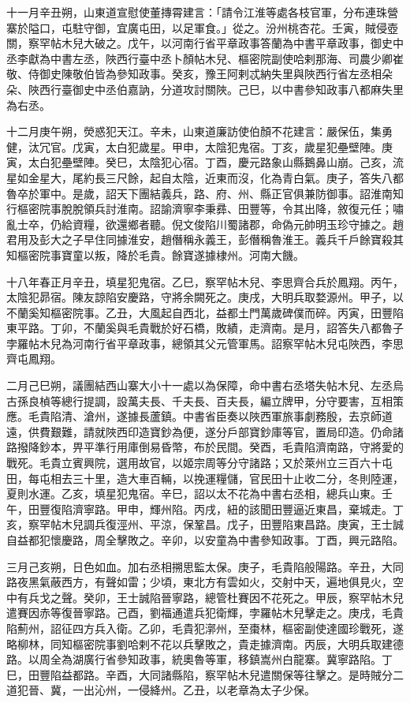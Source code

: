 \begin{pinyinscope}
 十一月辛丑朔，山東道宣慰使董摶霄建言：「請令江淮等處各枝官軍，分布連珠營寨於隘口，屯駐守御，宜廣屯田，以足軍食。」從之。汾州桃杏花。壬寅，賊侵壺關，察罕帖木兒大破之。戊午，以河南行省平章政事答蘭為中書平章政事，御史中丞李獻為中書左丞，陜西行臺中丞卜顏帖木兒、樞密院副使哈剌那海、司農少卿崔敬、侍御史陳敬伯皆為參知政事。癸亥，豫王阿剌忒納失里與陜西行省左丞相朵朵、陜西行臺御史中丞伯嘉訥，分道攻討關陜。己巳，以中書參知政事八都麻失里為右丞。



 十二月庚午朔，熒惑犯天江。辛未，山東道廉訪使伯顏不花建言：嚴保伍，集勇健，汰冗官。戊寅，太白犯歲星。甲申，太陰犯鬼宿。丁亥，歲星犯壘壁陣。庚寅，太白犯壘壁陣。癸巳，太陰犯心宿。丁酉，慶元路象山縣鵝鼻山崩。己亥，流星如金星大，尾約長三尺餘，起自太陰，近東而沒，化為青白氣。庚子，答失八都魯卒於軍中。是歲，詔天下團結義兵，路、府、州、縣正官俱兼防御事。詔淮南知行樞密院事脫脫領兵討淮南。詔諭濟寧李秉彞、田豐等，令其出降，敘復元任；嘯亂士卒，仍給資糧，欲還鄉者聽。倪文俊陷川蜀諸郡，命偽元帥明玉珍守據之。趙君用及彭大之子早住同據淮安，趙僭稱永義王，彭僭稱魯淮王。義兵千戶餘寶殺其知樞密院事寶童以叛，降於毛貴。餘寶遂據棣州。河南大饑。



 十八年春正月辛丑，填星犯鬼宿。乙巳，察罕帖木兒、李思齊合兵於鳳翔。丙午，太陰犯昴宿。陳友諒陷安慶路，守將余闕死之。庚戌，大明兵取婺源州。甲子，以不蘭奚知樞密院事。乙丑，大風起自西北，益都土門萬歲碑僕而碎。丙寅，田豐陷東平路。丁卯，不蘭奚與毛貴戰於好石橋，敗績，走濟南。是月，詔答失八都魯子孛羅帖木兒為河南行省平章政事，總領其父元管軍馬。詔察罕帖木兒屯陜西，李思齊屯鳳翔。



 二月己巳朔，議團結西山寨大小十一處以為保障，命中書右丞塔失帖木兒、左丞烏古孫良楨等總行提調，設萬夫長、千夫長、百夫長，編立牌甲，分守要害，互相策應。毛貴陷清、滄州，遂據長蘆鎮。中書省臣奏以陜西軍旅事劇務殷，去京師道遠，供費艱難，請就陜西印造寶鈔為便，遂分戶部寶鈔庫等官，置局印造。仍命諸路撥降鈔本，畀平準行用庫倒易昏幣，布於民間。癸酉，毛貴陷濟南路，守將愛的戰死。毛貴立賓興院，選用故官，以姬宗周等分守諸路；又於萊州立三百六十屯田，每屯相去三十里，造大車百輛，以挽運糧儲，官民田十止收二分，冬則陸運，夏則水運。乙亥，填星犯鬼宿。辛巳，詔以太不花為中書右丞相，總兵山東。壬午，田豐復陷濟寧路。甲申，輝州陷。丙戌，紐的該聞田豐逼近東昌，棄城走。丁亥，察罕帖木兒調兵復涇州、平涼，保鞏昌。戊子，田豐陷東昌路。庚寅，王士誠自益都犯懷慶路，周全擊敗之。辛卯，以安童為中書參知政事。丁酉，興元路陷。



 三月己亥朔，日色如血。加右丞相搠思監太保。庚子，毛貴陷般陽路。辛丑，大同路夜黑氣蔽西方，有聲如雷；少頃，東北方有雲如火，交射中天，遍地俱見火，空中有兵戈之聲。癸卯，王士誠陷晉寧路，總管杜賽因不花死之。甲辰，察罕帖木兒遣賽因赤等復晉寧路。己酉，劉福通遣兵犯衛輝，孛羅帖木兒擊走之。庚戌，毛貴陷薊州，詔征四方兵入衛。乙卯，毛貴犯漷州，至棗林，樞密副使達國珍戰死，遂略柳林，同知樞密院事劉哈剌不花以兵擊敗之，貴走據濟南。丙辰，大明兵取建德路。以周全為湖廣行省參知政事，統奧魯等軍，移鎮嵩州白龍寨。冀寧路陷。丁巳，田豐陷益都路。辛酉，大同諸縣陷，察罕帖木兒遣關保等往擊之。是時賊分二道犯晉、冀，一出沁州，一侵絳州。乙丑，以老章為太子少保。




\end{pinyinscope}
